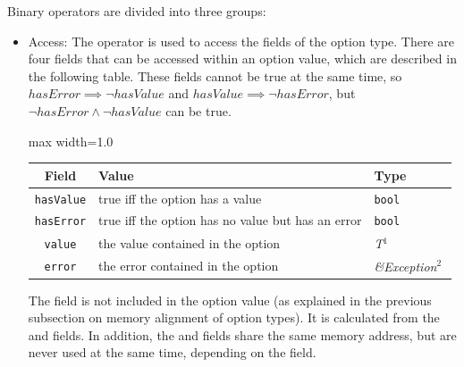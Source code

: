 Binary operators are divided into three groups:
\begin{itemize}
  \setlength\itemsep{-4pt}
\item Access: The  operator is used to access the fields of the option
  type. There are four fields that can be accessed within an option value, which
  are described in the following table. These fields cannot be true at the same
  time, so $hasError \implies \lnot hasValue$ and $hasValue \implies \lnot
  hasError$, but $\lnot hasError \land \lnot hasValue$ can be true.

  \begin{center}\begin{adjustbox}{max width=1.0\linewidth}
      \begin{threeparttable}
        \begin{tabular}{|c|ll|}
          \hline
          Field & Value & Type \\
          \hline
          \hline
          \texttt{hasValue} & true iff the option has a value & \texttt{bool} \\
          \texttt{hasError} & true iff the option has no value but has an error & \texttt{bool} \\
          \Xhline{0.001pt}
          \texttt{value} & the value contained in the option & \textit{T}$^{1^{\phantom{j}}}$ \\
          \texttt{error} & the error contained in the option & \textit{\&Exception}$^{2^{\phantom{j}}}$ \\
          \hline
        \end{tabular}
      \end{threeparttable}
  \end{adjustbox}\end{center}

  The  field is not included in the option value (as explained
  in the previous subsection on memory alignment of option types). It is
  calculated from the  and  fields. In addition, the
   and  fields share the same memory address, but
  are never used at the same time, depending on the  field.


\end{itemize}
